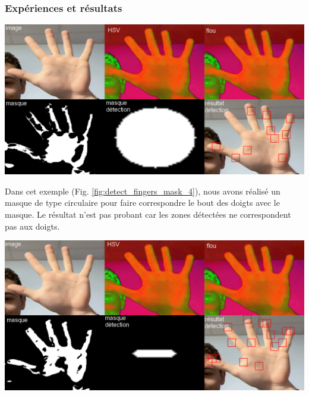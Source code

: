 \documentclass[11pt]{article}
\begin{document}
\subsubsection{Expériences et résultats}

\begin{center}
    \includegraphics[width=\textwidth]{images/detect_fingers_mask_4.png}
    \label{fig:detect_fingers_mask_4}
\end{center}

Dans cet exemple (Fig. \ref{fig:detect_fingers_mask_4}), nous avons réalisé un masque de type circulaire pour faire correspondre
le bout des doigts avec le masque. Le résultat n'est pas probant car les zones détectées ne correspondent pas aux doigts.

\begin{center}
    \includegraphics[width=\textwidth]{images/detect_fingers_mask_5.png}
    \label{fig:detect_fingers_mask_5}
\end{center}
\end{document}
